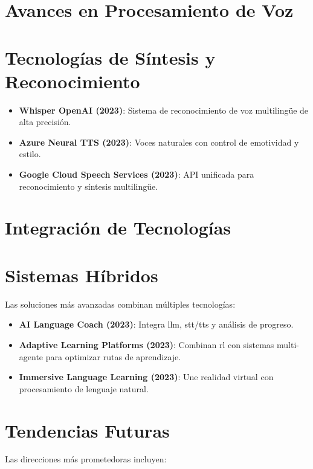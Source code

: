 \section{Avances en Procesamiento de Voz}

\section{Tecnologías de Síntesis y Reconocimiento}
\begin{itemize}
  \item \textbf{Whisper OpenAI (2023)}: Sistema de reconocimiento de voz multilingüe de alta precisión.

  \item \textbf{Azure Neural TTS (2023)}: Voces naturales con control de emotividad y estilo.

  \item \textbf{Google Cloud Speech Services (2023)}: API unificada para reconocimiento y síntesis multilingüe.
\end{itemize}

\section{Integración de Tecnologías}

\section{Sistemas Híbridos}
Las soluciones más avanzadas combinan múltiples tecnologías:

\begin{itemize}
  \item \textbf{AI Language Coach (2023)}: Integra \gls{llm}, \gls{stt}/\gls{tts} y análisis de progreso.

  \item \textbf{Adaptive Learning Platforms (2023)}: Combinan \gls{rl} con sistemas multi-agente para optimizar rutas de aprendizaje.

  \item \textbf{Immersive Language Learning (2023)}: Une realidad virtual con procesamiento de lenguaje natural.
\end{itemize}

\section{Tendencias Futuras}

Las direcciones más prometedoras incluyen:

